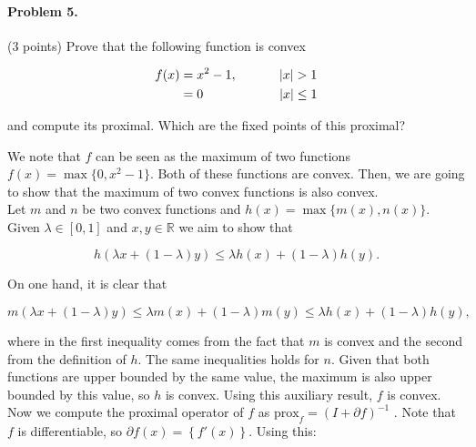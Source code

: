 \documentclass[12pt]{scrartcl}
\begin{document}

\begin{boxF}
\paragraph*{Problem 5.} (3 points) \hspace{0.15em} Prove that the following function is convex

    \begin{align*}
        f(x) &= x^2 -1, \hspace{3.3em} |x| > 1 \\
             &= 0       \hspace{6em} |x| \leq 1
    \end{align*}

and compute its proximal. Which are the fixed points of this proximal?
\end{boxF}

We note that $f$ can be seen as the maximum of two functions $f(x) = \max\{0, x^2-1\}$. Both of these functions are convex. Then, we are going to show that the maximum of two convex functions is also convex. \\

Let $m$ and $n$ be two convex functions and $h(x) = \max\{m(x), n(x)\}$. Given $\lambda \in [0,1]$ and $x, y \in \mathbb{R}$ we aim to show that 

\[
    h(\lambda x + (1- \lambda)y) \leq \lambda h(x) + (1- \lambda)h(y).
\]

On one hand, it is clear that 

\[
    m\left(\lambda x + (1- \lambda)y \right) \leq  \lambda m(x) + (1- \lambda)m(y) \leq  \lambda h(x) + (1- \lambda)h(y),
\]

where in the first inequality comes from the fact that $m$ is convex and the second from the definition of $h$. The same inequalities holds for $n$. Given that both functions are upper bounded by the same value, the maximum is also upper bounded by this value, so $h$ is convex. Using this auxiliary result, $f$ is convex. \\


Now we compute the proximal operator of $f$ as $\mbox{prox}_f = (I + \partial f)^{-1}$ . Note that $f$ is differentiable, so $\partial f (x) = \left\{ f'(x) \right\}$. Using this:
\end{document}
